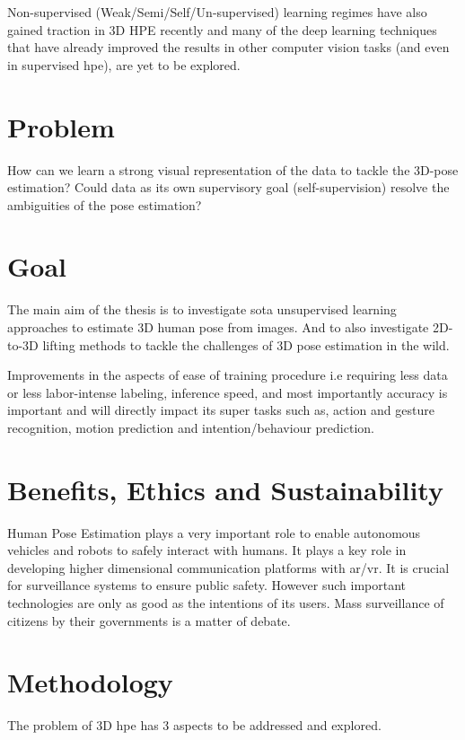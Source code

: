 Non-supervised (Weak/Semi/Self/Un-supervised) learning regimes have also gained traction in 3D HPE recently and many of the deep learning techniques that have already improved the results in other computer vision tasks (and even in supervised \ac{hpe}), are yet to be explored. 

\section{Problem}
\label{sec:problem}
How can we learn a strong visual representation of the data to tackle the 3D-pose estimation? Could data as its own supervisory goal (self-supervision) resolve the ambiguities of the pose estimation?


\section{Goal}

The main aim of the thesis is to investigate \ac{sota} unsupervised learning approaches to estimate 3D human pose from images. And to also investigate 2D-to-3D lifting methods to tackle the challenges of 3D pose estimation in the wild. 

Improvements in the aspects of ease of training procedure i.e requiring less data or less labor-intense labeling, inference speed, and most importantly accuracy is important and will directly impact its super tasks such as, action and gesture recognition, motion prediction and intention/behaviour prediction.

\section{Benefits, Ethics and Sustainability}
Human Pose Estimation plays a very important role to enable autonomous vehicles and robots to safely interact with humans. It plays a key role in developing higher dimensional communication platforms with \ac{ar/vr}. It is crucial for surveillance systems to ensure public safety. However such important technologies are only as good as the intentions of its users. Mass surveillance of citizens by their governments is a matter of debate.  

\section{Methodology}

The problem of 3D \ac{hpe} has 3 aspects to be addressed and explored. 

